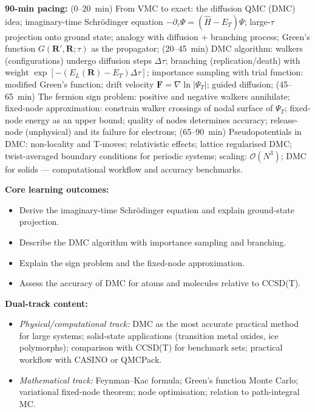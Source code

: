 \documentclass[11pt,a4paper]{article}
\begin{document}
\begin{tcolorbox}[modulebox, title={Module~II.1 --- Lecture L06: Quantum Monte Carlo II --- Diffusion QMC}]
\textbf{90-min pacing:} (0--20~min) From VMC to exact: the diffusion QMC (DMC) idea;
imaginary-time Schr\"odinger equation $-\partial_\tau\Psi=(\hat{H}-E_T)\Psi$;
large-$\tau$ projection onto ground state; analogy with diffusion + branching process;
Green's function $G(\mathbf{R}',\mathbf{R};\tau)$ as the propagator;
(20--45~min) DMC algorithm: walkers (configurations) undergo diffusion steps $\Delta\tau$;
branching (replication/death) with weight $\exp[-(E_L(\mathbf{R})-E_T)\Delta\tau]$;
importance sampling with trial function: modified Green's function;
drift velocity $\mathbf{F}=\nabla\ln|\Psi_T|$; guided diffusion;
(45--65~min) The fermion sign problem: positive and negative walkers annihilate;
fixed-node approximation: constrain walker crossings of nodal surface of $\Psi_T$;
fixed-node energy as an upper bound; quality of nodes determines accuracy;
release-node (unphysical) and its failure for electrons;
(65--90~min) Pseudopotentials in DMC: non-locality and T-moves; relativistic effects;
lattice regularised DMC; twist-averaged boundary conditions for periodic systems;
scaling: $\mathcal{O}(N^3)$; DMC for solids --- computational workflow and accuracy benchmarks.

\medskip\textbf{Core learning outcomes:}
\begin{itemize}[leftmargin=1.4em,topsep=2pt,itemsep=1pt]
  \item Derive the imaginary-time Schr\"odinger equation and explain ground-state projection.
  \item Describe the DMC algorithm with importance sampling and branching.
  \item Explain the sign problem and the fixed-node approximation.
  \item Assess the accuracy of DMC for atoms and molecules relative to CCSD(T).
\end{itemize}

\medskip\textbf{Dual-track content:}
\begin{itemize}[leftmargin=1.4em,topsep=2pt,itemsep=1pt]
  \item \textit{Physical/computational track:} DMC as the most accurate practical
    method for large systems; solid-state applications (transition metal oxides, ice polymorphs);
    comparison with CCSD(T) for benchmark sets; practical workflow with CASINO or QMCPack.
  \item \textit{Mathematical track:} Feynman--Kac formula; Green's function Monte Carlo;
    variational fixed-node theorem; node optimisation; relation to path-integral MC.
\end{itemize}


\end{tcolorbox}
\end{document}
